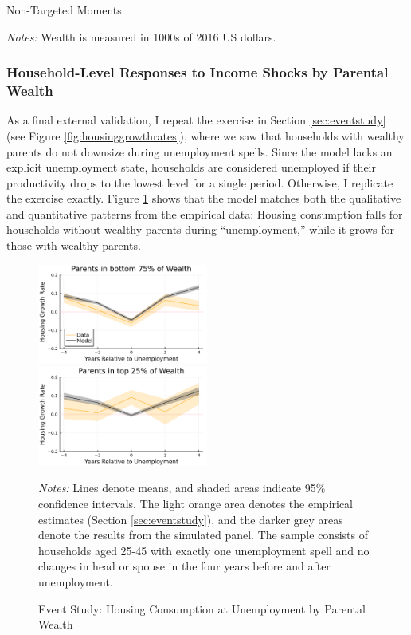 \documentclass[12pt]{article}
\begin{document}
\begin{table}
	\center 
	\begin{threeparttable}
	\caption{Non-Targeted Moments}\label{tab:nontargeted}
	
	\footnotesize 
	\textit{Notes:} Wealth is measured in 1000s of 2016 US dollars.
\end{threeparttable}
\end{table}

\subsubsection{Household-Level Responses to Income Shocks by Parental Wealth}
As a final external validation, I repeat the exercise in Section \ref{sec:eventstudy} (see Figure \ref{fig:housinggrowthrates}), where we saw that households with wealthy parents do not downsize during unemployment spells. Since the model lacks an explicit unemployment state, households are considered unemployed if their productivity drops to the lowest level for a single period. Otherwise, I replicate the exercise exactly. Figure \ref{fig:housinggrowthrates_model} shows that the model matches both the qualitative and quantitative patterns from the empirical data: Housing consumption falls for households without wealthy parents during ``unemployment,'' while it grows for those with wealthy parents.

\begin{figure}
	\caption{Event Study: Housing Consumption at Unemployment by Parental Wealth}\label{fig:housinggrowthrates_model}
	\includegraphics[width=0.5\textwidth]{../tabfig/model_housinggrowthpoor_both}%
	\includegraphics[width=0.5\textwidth]{../tabfig/model_housinggrowthrich_both}
	
	{\begin{footnotesize} \textit{Notes:} Lines denote means, and shaded areas indicate 95\% confidence intervals. The light orange area denotes the empirical estimates (Section \ref{sec:eventstudy}), and the darker grey areas denote the results from the simulated panel. The sample consists of households aged 25-45 with exactly one unemployment spell and no changes in head or spouse in the four years before and after unemployment. \end{footnotesize}}
\end{figure}
\end{document}
